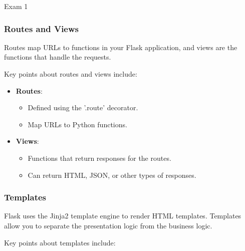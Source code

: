\begin{examnotes}{Exam 1}
    \subsubsection*{Routes and Views}
    
    Routes map URLs to functions in your Flask application, and views are the functions that handle the requests.
    
    \begin{highlight}
        Key points about routes and views include:
        
        \begin{itemize}
            \item \textbf{Routes}:
                \begin{itemize}
                    \item Defined using the '\@app.route' decorator.
                    \item Map URLs to Python functions.
                \end{itemize}
            \item \textbf{Views}:
                \begin{itemize}
                    \item Functions that return responses for the routes.
                    \item Can return HTML, JSON, or other types of responses.
                \end{itemize}
        \end{itemize}
    \end{highlight}
    
    \subsubsection*{Templates}
    
    Flask uses the Jinja2 template engine to render HTML templates. Templates allow you to separate the presentation logic from the business logic.
    
    \begin{highlight}[Templates]
        Key points about templates include:
        

\end{highlight}
\end{examnotes}
